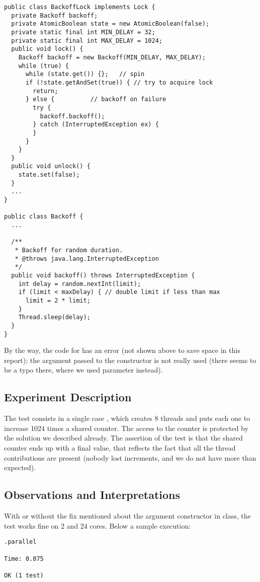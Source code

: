 \begin{lstlisting}[style=numbers]
public class BackoffLock implements Lock {
  private Backoff backoff;
  private AtomicBoolean state = new AtomicBoolean(false);  
  private static final int MIN_DELAY = 32;
  private static final int MAX_DELAY = 1024;
  public void lock() {
    Backoff backoff = new Backoff(MIN_DELAY, MAX_DELAY);
    while (true) {
      while (state.get()) {};	// spin
      if (!state.getAndSet(true)) { // try to acquire lock
        return;
      } else {			// backoff on failure
        try {
          backoff.backoff();
        } catch (InterruptedException ex) {
        }
      }
    }
  }  
  public void unlock() {
    state.set(false);
  }
  ...
}

public class Backoff {
  ...
  
  /**
   * Backoff for random duration.
   * @throws java.lang.InterruptedException 
   */
  public void backoff() throws InterruptedException {
    int delay = random.nextInt(limit);
    if (limit < maxDelay) { // double limit if less than max
      limit = 2 * limit;
    }
    Thread.sleep(delay);
  }
}
\end{lstlisting}
\hfill

By the way, the code for  has an error (not shown above to
save space in this report); the argument
 passed to the constructor is not really used (there seems to
be a typo there, where we used  parameter instead). 

\subsection{Experiment Description}

The test consists in a single case , which creates 8
threads and puts each one to increase 1024 times a shared counter. The
access to the counter is protected by the  solution we
described already. The assertion of the test is that the shared
counter ends up with a final value, that reflects the fact that all
the thread contributions are present (nobody lost increments, and we
do not have more than expected).

\subsection{Observations and Interpretations}
With or without the fix mentioned about the  argument
constructor in  class, the test works fine on 2 and 24
cores. Below a sample execution: \\

\begin{verbatim}
.parallel

Time: 0.075

OK (1 test)
\end{verbatim}
\hfill

